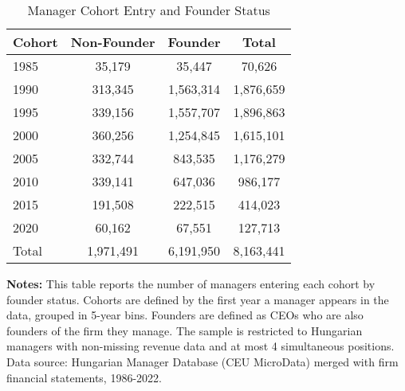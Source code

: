 \begin{table}[htbp]\centering
\caption{Manager Cohort Entry and Founder Status}\label{tab:cohort_founders}
\begin{threeparttable}
\begin{tabular}{lccc}
\toprule
Cohort & Non-Founder & Founder & Total \\
\midrule
1985 &       35,179 &       35,447 &       70,626 \\
1990 &      313,345 &    1,563,314 &    1,876,659 \\
1995 &      339,156 &    1,557,707 &    1,896,863 \\
2000 &      360,256 &    1,254,845 &    1,615,101 \\
2005 &      332,744 &      843,535 &    1,176,279 \\
2010 &      339,141 &      647,036 &      986,177 \\
2015 &      191,508 &      222,515 &      414,023 \\
2020 &       60,162 &       67,551 &      127,713 \\
\midrule
Total &    1,971,491 &    6,191,950 &    8,163,441 \\
\bottomrule
\end{tabular}
\begin{tablenotes}
\footnotesize
\item \textbf{Notes:} This table reports the number of managers entering each cohort by founder status. Cohorts are defined by the first year a manager appears in the data, grouped in 5-year bins. Founders are defined as CEOs who are also founders of the firm they manage. The sample is restricted to Hungarian managers with non-missing revenue data and at most 4 simultaneous positions. Data source: Hungarian Manager Database (CEU MicroData) merged with firm financial statements, 1986-2022.
\end{tablenotes}
\end{threeparttable}
\end{table}
